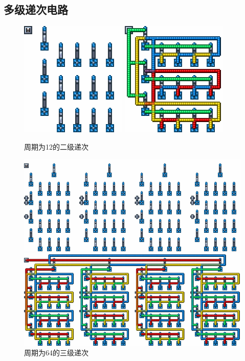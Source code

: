 \subsection{多级递次电路}\label{sec5}
\begin{figure}
    \centering
    \includegraphics{images/313.png}
    \qquad
    \includegraphics{images/314.png}
    \caption{周期为12的二级递次}
\end{figure}
\begin{figure}
    \centering
    \includegraphics[width=\textwidth]{images/316.png}
    
    \includegraphics[width=\textwidth]{images/315.png}
    \caption{周期为64的三级递次}
\end{figure}
